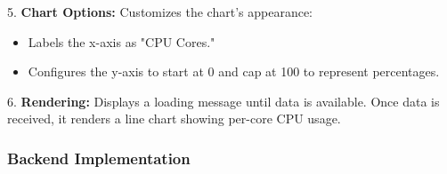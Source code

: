\documentclass[12pt]{article}
\begin{document}
5. \textbf{Chart Options:}
   Customizes the chart's appearance:
   \begin{itemize}
       \item Labels the x-axis as "CPU Cores."
       \item Configures the y-axis to start at 0 and cap at 100 to represent percentages.
   \end{itemize}

6. \textbf{Rendering:}
   Displays a loading message until data is available. Once data is received, it renders a line chart showing per-core CPU usage.

\subsubsection{Backend Implementation}
        
\end{document}
